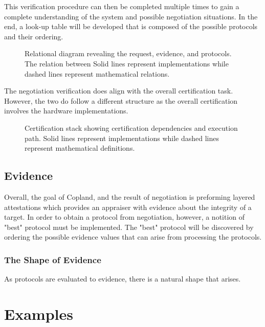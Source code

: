 \documentclass[10pt]{report}
\begin{document}
This verification procedure can then be completed multiple times to gain
a complete understanding of the system and possible negotiation situations.
In the end, a look-up table will be developed that is composed of the possible
protocols and their ordering. 

\begin{figure}[hbtp]
  \centering
  
  \caption[Relational Figure]{ Relational diagram revealing the request,
    evidence, and protocols. The relation between  Solid lines
    represent implementations while dashed lines represent
    mathematical relations.}
  \label{fig:certification-fig}
\end{figure}

The negotiation verification does align with the overall certification task.
However, the two do follow a different structure as the overall certification
involves the hardware implementations. 

\begin{figure}[hbtp]
  \centering
  
  \caption[Certification Figure]{Certification stack showing
    certification dependencies and execution path. Solid lines
    represent implementations while dashed lines represent
    mathematical definitions.}
  \label{fig:certification-fig}
\end{figure}

\section{Evidence}

Overall, the goal of Copland, and the result of negotiation is preforming
layered attestations which provides
an appraiser with evidence about the integrity of a target. In order to obtain
a protocol from negotiation, however, a notition of "best" protocol must
be implemented. The "best" protocol will be discovered by ordering the
possible evidence values that can arise from processing the protocols. 

\subsection{The Shape of Evidence}

As protocols are evaluated to evidence, there is a natural shape that
arises. 

\chapter{Examples}
\end{document}
